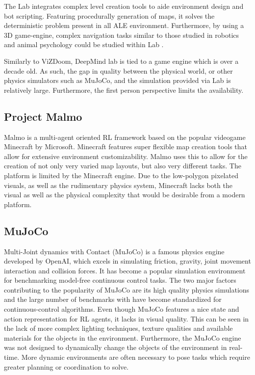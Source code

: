 The Lab integrates complex level creation tools to aide environment design and bot scripting. Featuring procedurally generation of maps, it solves the deterministic problem present in all ALE environment. Furthermore, by using a 3D game-engine, complex navigation tasks similar to those studied in robotics and animal psychology could be studied within Lab \citep{Leibo2018}.

Similarly to ViZDoom, DeepMind lab is tied to a game engine which is over a decade old. As such, the gap in quality between the physical world, or other physics simulators such as MuJoCo, and the simulation provided via Lab is relatively large. Furthermore, the first person perspective limits the availability.
 
\subsection{Project Malmo}
Malmo \citep{Johnson2016} is a multi-agent oriented RL framework based on the popular videogame Minecraft by Microsoft. Minecraft features super flexible map creation tools that allow for extensive environment customizability. Malmo uses this to allow for the creation of not only very varied map layouts, but also very different tasks. The platform is limited by the Minecraft engine. Due to the low-polygon pixelated visuals, as well as the rudimentary physics system, Minecraft lacks both the visual as well as the physical complexity that would be desirable from a modern platform.
 
\subsection{MuJoCo}
Multi-Joint dynamics with Contact (MuJoCo) is a famous physics engine developed by OpenAI, which excels in simulating friction, gravity, joint movement interaction and collision forces. It has become a popular simulation environment for benchmarking model-free continuous control tasks. The two major factors contributing to the popularity of MuJoCo are its high quality physics simulations and the large number of benchmarks with have become standardized for continuous-control algorithms. Even though MuJoCo features a nice state and action representation for RL agents, it lacks in visual quality. This can be seen in the lack of more complex lighting techniques, texture qualities and available materials for the objects in the environment. Furthermore, the MuJoCo engine was not designed to dynamically change the objects of the environment in real-time. More dynamic environments are often necessary to pose tasks which require greater planning or coordination to solve.

